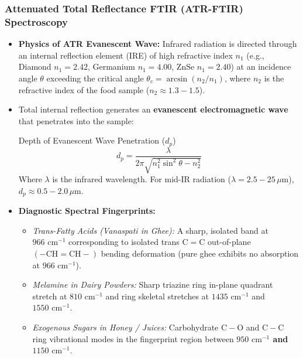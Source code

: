 \documentclass[11pt,a4paper,oneside]{article}
\begin{document}
\subsubsection{Attenuated Total Reflectance FTIR (ATR-FTIR) Spectroscopy}
\begin{itemize}[leftmargin=*]
    \item \textbf{Physics of ATR Evanescent Wave:} Infrared radiation is directed through an internal reflection element (IRE) of high refractive index $n_1$ (e.g., Diamond $n_1=2.42$, Germanium $n_1=4.00$, ZnSe $n_1=2.40$) at an incidence angle $\theta$ exceeding the critical angle $\theta_c = \arcsin(n_2/n_1)$, where $n_2$ is the refractive index of the food sample ($n_2 \approx 1.3-1.5$).
    \item Total internal reflection generates an \textbf{evanescent electromagnetic wave} that penetrates into the sample:
    \begin{formulabox}{Depth of Evanescent Wave Penetration ($d_p$)}
    $$d_p = \frac{\lambda}{2\pi \sqrt{n_1^2 \sin^2\theta - n_2^2}}$$
    Where $\lambda$ is the infrared wavelength. For mid-IR radiation ($\lambda = 2.5-25\,\mu\text{m}$), $d_p \approx 0.5-2.0\,\mu\text{m}$.
    \end{formulabox}
    \item \textbf{Diagnostic Spectral Fingerprints:}
    \begin{itemize}
        \item \textit{Trans-Fatty Acids (Vanaspati in Ghee):} A sharp, isolated band at \textbf{$966\text{ cm}^{-1}$} corresponding to isolated trans $\mathrm{C=C}$ out-of-plane $(-\mathrm{CH}=\mathrm{CH}-)$ bending deformation (pure ghee exhibits no absorption at $966\text{ cm}^{-1}$).
        \item \textit{Melamine in Dairy Powders:} Sharp triazine ring in-plane quadrant stretch at \textbf{$810\text{ cm}^{-1}$} and ring skeletal stretches at \textbf{$1435\text{ cm}^{-1}$} and \textbf{$1550\text{ cm}^{-1}$}.
        \item \textit{Exogenous Sugars in Honey / Juices:} Carbohydrate $\mathrm{C-O}$ and $\mathrm{C-C}$ ring vibrational modes in the fingerprint region between \textbf{$950\text{ cm}^{-1}$ and $1150\text{ cm}^{-1}$}.
    \end{itemize}
\end{itemize}
\end{document}
